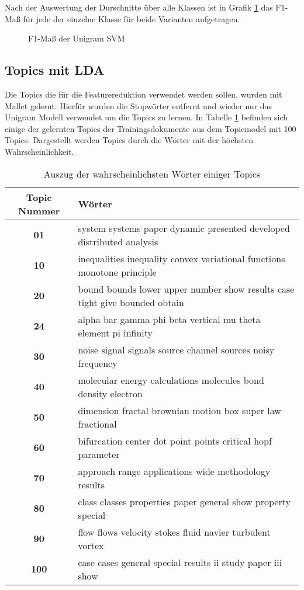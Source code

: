 Nach der Auswertung der Durschnitte über alle Klassen ist in Grafik \ref{fig:svm_text_eval} das F1-Maß für jede der einzelne
Klasse für beide Varianten aufgetragen.

\begin{figure}[H]
    \centering
    \def\svgwitdth{0.1\columnwidth}
    
    \caption{F1-Maß der Unigram SVM}
    \label{fig:svm_text_eval}
\end{figure}

\subsection{Topics mit LDA}
\label{sub:topics}
Die Topics die für die Featurereduktion verwendet werden sollen, wurden mit Mallet \cite{McCallumMALLET} gelernt.
Hierfür wurden die Stopwörter entfernt und wieder nur das Unigram Modell verwendet um die Topics zu lernen. 
In Tabelle \ref{tab:topics_words} befinden sich einige der gelernten Topics der Trainingsdokumente aus dem Topicmodel mit 100 Topics. Dargestellt werden Topics durch die Wörter mit der höchsten Wahrscheinlichkeit.

\begin{table}[h]
    \centering
    \begin{tabular}{c|l}
        \small \textbf{Topic Nummer} & \small\textbf{Wörter}\\
        \hline
        \small \textbf{01} & \small system systems paper dynamic presented developed distributed analysis\\
        \small \textbf{10} & \small inequalities inequality convex variational functions monotone principle\\
        \small \textbf{20} & \small bound bounds lower upper number show results case tight give bounded obtain \\
        \small \textbf{24} & \small alpha bar gamma phi beta vertical mu theta element pi infinity \\
        \small \textbf{30} & \small noise signal signals source channel sources noisy frequency \\
        \small \textbf{40} & \small molecular energy calculations molecules bond density electron \\
        \small \textbf{50} & \small dimension fractal brownian motion box super law fractional \\
        \small \textbf{60} & \small bifurcation center dot point points critical hopf parameter \\
        \small \textbf{70} & \small approach range applications wide methodology results \\
        \small \textbf{80} & \small class classes properties paper general show property special \\
        \small \textbf{90} & \small flow flows velocity stokes fluid navier turbulent vortex \\
        \small \textbf{100}& \small case cases general special results ii study paper iii show
    \end{tabular}
    \caption{Auszug der wahrscheinlichsten Wörter einiger Topics}
    \label{tab:topics_words}
\end{table}

